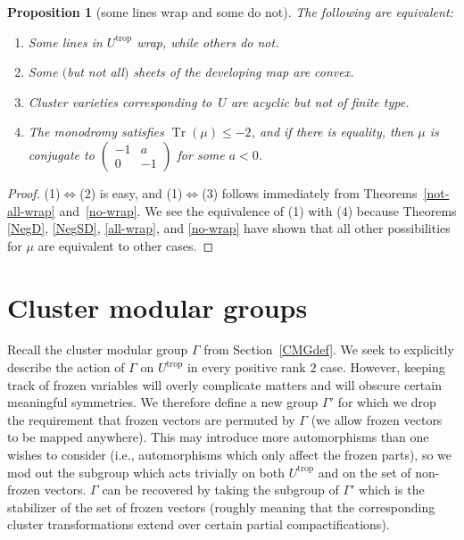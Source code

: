 \documentclass[pdftex]{sigma}
\numberwithin{equation}{section}
\numberwithin{figure}{section}
\numberwithin{table}{section}
\DeclareMathOperator{\Tr}{Tr}
\DeclareMathOperator{\trop}{trop}
\newtheorem{prop}[thm]{Proposition}
\theoremstyle{definition}
\begin{document}
\begin{prop}[some lines wrap and some do not]\label{SomeWrap} The following are equivalent:
\begin{enumerate}\itemsep=0pt
\item[$1.$] Some {lines} in $U^{\trop}$ wrap, while others do not.
\item[$2.$] Some $($but not all$)$ sheets of the {developing map} are convex.
\item[$3.$] Cluster varieties corresponding to~$U$ are {acyclic} but not of {finite type}.
\item[$4.$] The {monodromy} satisfies $\Tr(\mu) \leq -2$, and if there is equality, then $\mu$ is conjugate to $
	\left(\begin{smallmatrix}
		-1 &a \\
		0 &-1
		\end{smallmatrix}\right)$ for some $a<0$.
\end{enumerate}
\end{prop}
\begin{proof}(1)$\Leftrightarrow$(2) is easy, and (1)$\Leftrightarrow$(3) follows immediately from Theorems~\ref{not-all-wrap} and~\ref{no-wrap}. We see the equivalence of (1) with (4) because Theorems \ref{NegD}, \ref{NegSD}, \ref{all-wrap}, and \ref{no-wrap} have shown that all other possibilities for $\mu$ are equivalent to other cases.
\end{proof}

\section{Cluster modular groups}\label{CMG}

Recall the cluster modular group $\Gamma$ from Section~\ref{CMGdef}. We seek to explicitly describe the action of $\Gamma$ on $U^{\trop}$ in every positive rank $2$ case. However, keeping track of frozen variables will overly complicate matters and will obscure certain meaningful symmetries. We therefore define a new group $\Gamma'$ for which we drop the requirement that frozen vectors are permuted by $\Gamma$ (we allow frozen vectors to be mapped anywhere). This may introduce more automorphisms than one wishes to consider (i.e., automorphisms which only affect the frozen parts), so we mod out the subgroup which acts trivially on both $U^{\trop}$ and on the set of non-frozen vectors. $\Gamma$ can be recovered by taking the subgroup of $\Gamma'$ which is the stabilizer of the set of frozen vectors (roughly meaning that the corresponding cluster transformations extend over certain partial compactifications).
\end{document}
